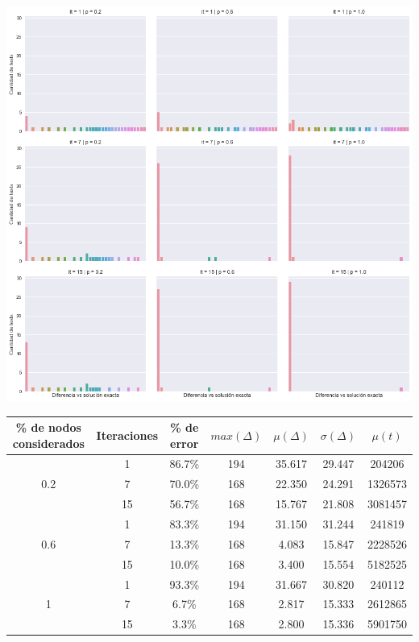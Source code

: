 \begin{center}
    \includegraphics[scale=0.6]{img/path-grasp-3x3.png}

    \begin{tabular}{ | c | c | c | c | c | c | c |}
        \hline
        \% de nodos considerados & Iteraciones & \% de error & $max(\Delta)$ & $\mu(\Delta)$ & $\sigma(\Delta)$ & $\mu(t)$ \\ \hline
            & 1  & 86.7\% & 194 & 35.617 & 29.447 &  204206 \\ \cline{2-7}
        0.2 & 7  & 70.0\% & 168 & 22.350 & 24.291 & 1326573 \\ \cline{2-7}
            & 15 & 56.7\% & 168 & 15.767 & 21.808 & 3081457 \\ \hline
            & 1  & 83.3\% & 194 & 31.150 & 31.244 &  241819 \\ \cline{2-7}
        0.6 & 7  & 13.3\% & 168 &  4.083 & 15.847 & 2228526 \\ \cline{2-7}
            & 15 & 10.0\% & 168 &  3.400 & 15.554 & 5182525 \\ \hline
            & 1  & 93.3\% & 194 & 31.667 & 30.820 &  240112 \\ \cline{2-7}
        1   & 7  &  6.7\% & 168 &  2.817 & 15.333 & 2612865 \\ \cline{2-7}
            & 15 &  3.3\% & 168 &  2.800 & 15.336 & 5901750 \\
        \hline
    \end{tabular}
\end{center}

